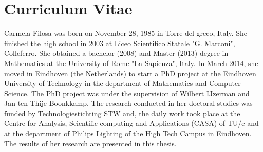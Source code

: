 \chapter*{Curriculum Vitae}
Carmela Filosa was born on November 28, 1985 in Torre del greco, Italy. She finished the high school in 2003 at Liceo Scientifico Statale "G. Marconi", Colleferro. She obtained a bachelor (2008) and Master (2013) degree in Mathematics at the University of Rome "La Sapienza", Italy. In March 2014, she moved in Eindhoven (the Netherlands) to start a PhD project at the Eindhoven University of Technology in the department of Mathematics and Computer Science. The PhD project was under the supervision of Wilbert IJzerman and Jan ten Thije Boonkkamp. The research conducted in her doctoral studies was funded by Technologiestichting STW and, the daily work took place at the Centre for Analysis, Scientific computing and Applications (CASA) of TU/e and at the department of Philips Lighting of the High Tech Campus in Eindhoven. 
The results of her research are presented in this thesis.  

